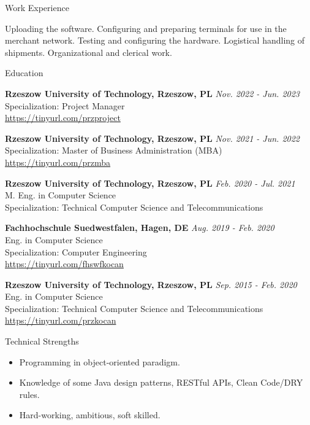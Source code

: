 \documentclass{resume}
\begin{document}
\begin{rSection}{Work Experience}
\begin{rSubsection}
        \item[] {Uploading the software. Configuring and preparing terminals for use in the merchant
                    network. Testing and configuring the hardware. Logistical handling of shipments. Organizational and clerical work.}

    \end{rSubsection}

\end{rSection}

\begin{rSection}{Education}

    {\bf Rzeszow University of Technology, Rzeszow, PL} \hfill {\em Nov. 2022 - Jun. 2023} \\
    Specialization: Project Manager \\
    \url{https://tinyurl.com/przproject}

    {\bf Rzeszow University of Technology, Rzeszow, PL} \hfill {\em Nov. 2021 - Jun. 2022} \\
    Specialization: Master of Business Administration (MBA) \\
    \url{https://tinyurl.com/przmba}

    {\bf Rzeszow University of Technology, Rzeszow, PL} \hfill {\em Feb. 2020 - Jul. 2021} \\
    M. Eng. in Computer Science \\
    Specialization: Technical Computer Science and Telecommunications

    {\bf Fachhochschule Suedwestfalen, Hagen, DE} \hfill {\em Aug. 2019 - Feb. 2020} \\
    Eng. in Computer Science \\
    Specialization: Computer Engineering \\
    \url{https://tinyurl.com/fhswfkocan}

    {\bf Rzeszow University of Technology, Rzeszow, PL} \hfill {\em Sep. 2015 - Feb. 2020} \\
    Eng. in Computer Science \\
    Specialization: Technical Computer Science and Telecommunications \\
    \url{https://tinyurl.com/przkocan}

\end{rSection}

\begin{rSection}{Technical Strengths}

    \begin{itemize}
        \item Programming in object-oriented paradigm.
        \item Knowledge of some Java design patterns, RESTful APIs, Clean Code/DRY rules.
        \item Hard-working, ambitious, soft skilled.
    \end{itemize}

\end{rSection}
\end{document}
